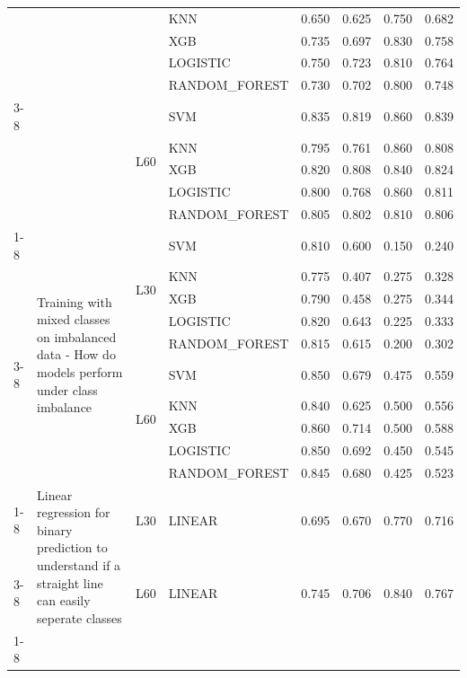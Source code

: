 \begin{table}
\begin{tabular}{llllrrrr}
 &  &  & KNN & 0.650 & 0.625 & 0.750 & 0.682 \\
 &  &  & XGB & 0.735 & 0.697 & 0.830 & 0.758 \\
 &  &  & LOGISTIC & 0.750 & 0.723 & 0.810 & 0.764 \\
 &  &  & RANDOM\_FOREST & 0.730 & 0.702 & 0.800 & 0.748 \\
\cline{3-8}
 &  & \multirow[t]{5}{*}{L60} & SVM & 0.835 & 0.819 & 0.860 & 0.839 \\
 &  &  & KNN & 0.795 & 0.761 & 0.860 & 0.808 \\
 &  &  & XGB & 0.820 & 0.808 & 0.840 & 0.824 \\
 &  &  & LOGISTIC & 0.800 & 0.768 & 0.860 & 0.811 \\
 &  &  & RANDOM\_FOREST & 0.805 & 0.802 & 0.810 & 0.806 \\
\cline{1-8} \cline{2-8} \cline{3-8}
\multirow[t]{10}{*}{Experiment 9} & \multirow[t]{10}{*}{Training with mixed classes on imbalanced data - How do models perform under class imbalance} & \multirow[t]{5}{*}{L30} & SVM & 0.810 & 0.600 & 0.150 & 0.240 \\
 &  &  & KNN & 0.775 & 0.407 & 0.275 & 0.328 \\
 &  &  & XGB & 0.790 & 0.458 & 0.275 & 0.344 \\
 &  &  & LOGISTIC & 0.820 & 0.643 & 0.225 & 0.333 \\
 &  &  & RANDOM\_FOREST & 0.815 & 0.615 & 0.200 & 0.302 \\
\cline{3-8}
 &  & \multirow[t]{5}{*}{L60} & SVM & 0.850 & 0.679 & 0.475 & 0.559 \\
 &  &  & KNN & 0.840 & 0.625 & 0.500 & 0.556 \\
 &  &  & XGB & 0.860 & 0.714 & 0.500 & 0.588 \\
 &  &  & LOGISTIC & 0.850 & 0.692 & 0.450 & 0.545 \\
 &  &  & RANDOM\_FOREST & 0.845 & 0.680 & 0.425 & 0.523 \\
\cline{1-8} \cline{2-8} \cline{3-8}
\multirow[t]{2}{*}{Experiment 10} & \multirow[t]{2}{*}{Linear regression for binary prediction to understand if a straight line can easily seperate classes} & L30 & LINEAR & 0.695 & 0.670 & 0.770 & 0.716 \\
\cline{3-8}
 &  & L60 & LINEAR & 0.745 & 0.706 & 0.840 & 0.767 \\
\cline{1-8} \cline{2-8} \cline{3-8}
\bottomrule
\end{tabular}
\end{table}
